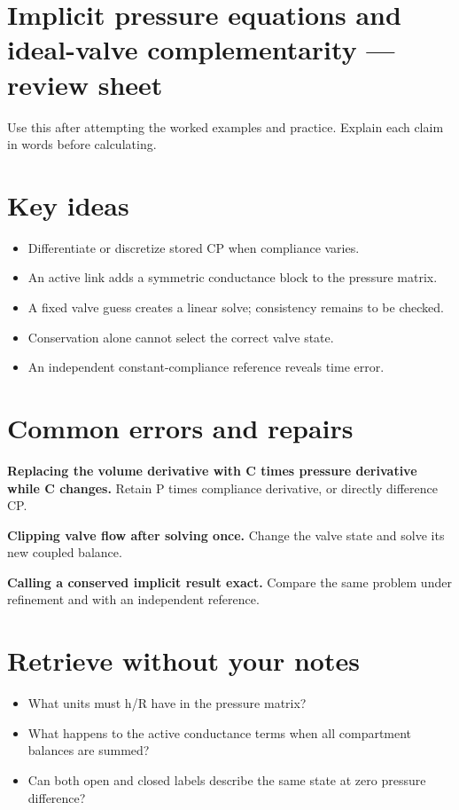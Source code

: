 \documentclass[11pt,letterpaper]{article}
\theoremstyle{definition}\newtheorem{definition}{Definition}\newtheorem{example}{Example}
\numberwithin{equation}{section}
\begin{document}
\section*{Implicit pressure equations and ideal-valve complementarity --- review sheet}
Use this after attempting the worked examples and practice. Explain each claim in words before calculating.

\section*{Key ideas}
\begin{itemize}
\item Differentiate or discretize stored CP when compliance varies.
\item An active link adds a symmetric conductance block to the pressure matrix.
\item A fixed valve guess creates a linear solve; consistency remains to be checked.
\item Conservation alone cannot select the correct valve state.
\item An independent constant-compliance reference reveals time error.
\end{itemize}
\section*{Common errors and repairs}
\textbf{Replacing the volume derivative with C times pressure derivative while C changes.} Retain P times compliance derivative, or directly difference CP.

\textbf{Clipping valve flow after solving once.} Change the valve state and solve its new coupled balance.

\textbf{Calling a conserved implicit result exact.} Compare the same problem under refinement and with an independent reference.

\section*{Retrieve without your notes}
\begin{itemize}
\item What units must h/R have in the pressure matrix?
\item What happens to the active conductance terms when all compartment balances are summed?
\item Can both open and closed labels describe the same state at zero pressure difference?
\end{itemize}
\end{document}

